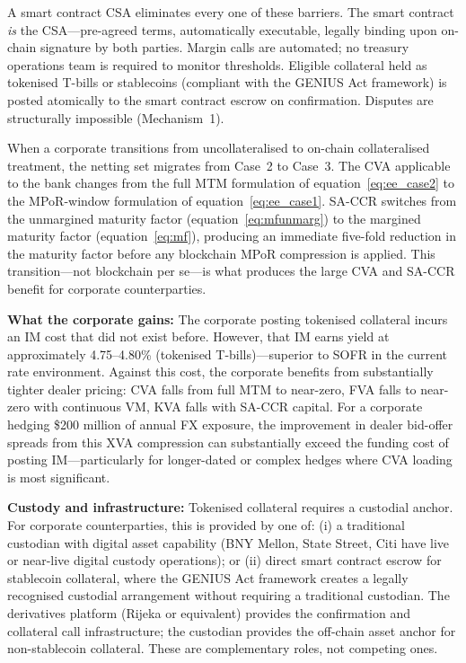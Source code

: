 \documentclass[12pt,letterpaper]{article}
\numberwithin{equation}{section}
\theoremstyle{remark}
\begin{document}
A smart contract CSA eliminates every one of these barriers. The smart
contract \emph{is} the CSA---pre-agreed terms, automatically executable,
legally binding upon on-chain signature by both parties. Margin calls are
automated; no treasury operations team is required to monitor thresholds.
Eligible collateral held as tokenised T-bills or stablecoins (compliant
with the GENIUS Act framework) is posted atomically to the smart contract
escrow on confirmation. Disputes are structurally impossible (Mechanism~1).

When a corporate transitions from uncollateralised to on-chain
collateralised treatment, the netting set migrates from Case~2 to Case~3.
The CVA applicable to the bank changes from the full MTM formulation of
equation~\eqref{eq:ee_case2} to the MPoR-window formulation of
equation~\eqref{eq:ee_case1}. SA-CCR switches from the unmargined maturity
factor (equation~\ref{eq:mfunmarg}) to the margined maturity factor
(equation~\ref{eq:mf}), producing an immediate five-fold reduction in the
maturity factor before any blockchain MPoR compression is applied. This
transition---not blockchain per se---is what produces the large CVA and
SA-CCR benefit for corporate counterparties.

\textbf{What the corporate gains:}
The corporate posting tokenised collateral incurs an IM cost that did not
exist before. However, that IM earns yield at approximately 4.75--4.80\%
(tokenised T-bills)---superior to SOFR in the current rate environment.
Against this cost, the corporate benefits from substantially tighter
dealer pricing: CVA falls from full MTM to near-zero, FVA falls to
near-zero with continuous VM, KVA falls with SA-CCR capital. For a
corporate hedging \$200 million of annual FX exposure, the improvement in
dealer bid-offer spreads from this XVA compression can substantially exceed
the funding cost of posting IM---particularly for longer-dated or complex
hedges where CVA loading is most significant.

\textbf{Custody and infrastructure:}
Tokenised collateral requires a custodial anchor. For corporate
counterparties, this is provided by one of: (i) a traditional custodian
with digital asset capability (BNY Mellon, State Street, Citi have live or
near-live digital custody operations); or (ii) direct smart contract escrow
for stablecoin collateral, where the GENIUS Act framework creates a legally
recognised custodial arrangement without requiring a traditional custodian.
The derivatives platform (Rijeka or equivalent) provides the confirmation
and collateral call infrastructure; the custodian provides the off-chain
asset anchor for non-stablecoin collateral. These are complementary roles,
not competing ones.
\end{document}
